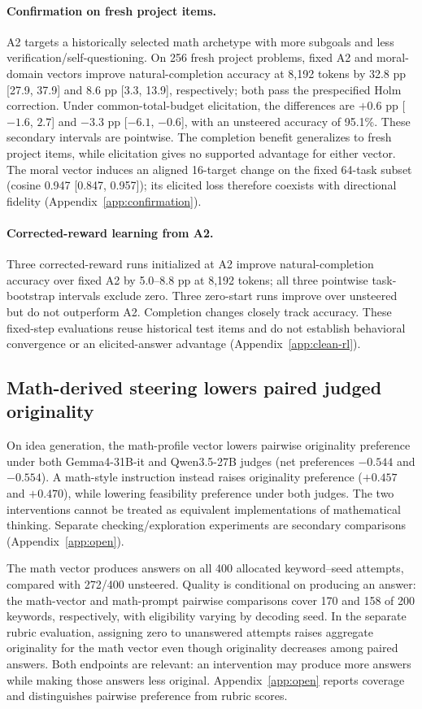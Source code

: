 \paragraph{Confirmation on fresh project items.}
A2 targets a historically selected math archetype with more subgoals and less verification/self-questioning. On 256 fresh project problems, fixed A2 and moral-domain vectors improve natural-completion accuracy at 8,192 tokens by 32.8 pp [27.9, 37.9] and 8.6 pp [3.3, 13.9], respectively; both pass the prespecified Holm correction. Under common-total-budget elicitation, the differences are $+0.6$ pp [$-1.6$, $2.7$] and $-3.3$ pp [$-6.1$, $-0.6$], with an unsteered accuracy of 95.1\%. These secondary intervals are pointwise. The completion benefit generalizes to fresh project items, while elicitation gives no supported advantage for either vector. The moral vector induces an aligned 16-target change on the fixed 64-task subset (cosine 0.947 [0.847, 0.957]); its elicited loss therefore coexists with directional fidelity (Appendix~\ref{app:confirmation}).

\paragraph{Corrected-reward learning from A2.}
Three corrected-reward runs initialized at A2 improve natural-completion accuracy over fixed A2 by 5.0--8.8 pp at 8,192 tokens; all three pointwise task-bootstrap intervals exclude zero. Three zero-start runs improve over unsteered but do not outperform A2. Completion changes closely track accuracy. These fixed-step evaluations reuse historical test items and do not establish behavioral convergence or an elicited-answer advantage (Appendix~\ref{app:clean-rl}).

\subsection{Math-derived steering lowers paired judged originality}
On idea generation, the math-profile vector lowers pairwise originality preference under both Gemma4-31B-it and Qwen3.5-27B judges (net preferences $-0.544$ and $-0.554$). A math-style instruction instead raises originality preference ($+0.457$ and $+0.470$), while lowering feasibility preference under both judges. The two interventions cannot be treated as equivalent implementations of mathematical thinking. Separate checking/exploration experiments are secondary comparisons (Appendix~\ref{app:open}).

The math vector produces answers on all 400 allocated keyword--seed attempts, compared with 272/400 unsteered. Quality is conditional on producing an answer: the math-vector and math-prompt pairwise comparisons cover 170 and 158 of 200 keywords, respectively, with eligibility varying by decoding seed. In the separate rubric evaluation, assigning zero to unanswered attempts raises aggregate originality for the math vector even though originality decreases among paired answers. Both endpoints are relevant: an intervention may produce more answers while making those answers less original. Appendix~\ref{app:open} reports coverage and distinguishes pairwise preference from rubric scores.
